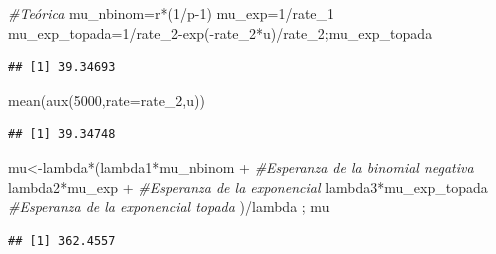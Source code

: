 \documentclass[
]{article}
\newenvironment{Shaded}{\begin{snugshade}}{\end{snugshade}}
\newcommand{\AttributeTok}[1]{\textcolor[rgb]{0.77,0.63,0.00}{#1}}
\newcommand{\CommentTok}[1]{\textcolor[rgb]{0.56,0.35,0.01}{\textit{#1}}}
\newcommand{\DecValTok}[1]{\textcolor[rgb]{0.00,0.00,0.81}{#1}}
\newcommand{\FunctionTok}[1]{\textcolor[rgb]{0.00,0.00,0.00}{#1}}
\newcommand{\NormalTok}[1]{#1}
\newcommand{\OtherTok}[1]{\textcolor[rgb]{0.56,0.35,0.01}{#1}}
\newcommand{\SpecialCharTok}[1]{\textcolor[rgb]{0.00,0.00,0.00}{#1}}
\begin{document}
\begin{Shaded}
\begin{Highlighting}[]
\CommentTok{\#Teórica}
\NormalTok{mu\_nbinom}\OtherTok{=}\NormalTok{r}\SpecialCharTok{*}\NormalTok{(}\DecValTok{1}\SpecialCharTok{/}\NormalTok{p}\DecValTok{{-}1}\NormalTok{)}
\NormalTok{mu\_exp}\OtherTok{=}\DecValTok{1}\SpecialCharTok{/}\NormalTok{rate\_1}
\NormalTok{mu\_exp\_topada}\OtherTok{=}\DecValTok{1}\SpecialCharTok{/}\NormalTok{rate\_2}\SpecialCharTok{{-}}\FunctionTok{exp}\NormalTok{(}\SpecialCharTok{{-}}\NormalTok{rate\_2}\SpecialCharTok{*}\NormalTok{u)}\SpecialCharTok{/}\NormalTok{rate\_2;mu\_exp\_topada}
\end{Highlighting}
\end{Shaded}

\begin{verbatim}
## [1] 39.34693
\end{verbatim}

\begin{Shaded}
\begin{Highlighting}[]
\FunctionTok{mean}\NormalTok{(}\FunctionTok{aux}\NormalTok{(}\DecValTok{5000}\NormalTok{,}\AttributeTok{rate=}\NormalTok{rate\_2,u))}
\end{Highlighting}
\end{Shaded}

\begin{verbatim}
## [1] 39.34748
\end{verbatim}

\begin{Shaded}
\begin{Highlighting}[]
\NormalTok{mu}\OtherTok{\textless{}{-}}\NormalTok{lambda}\SpecialCharTok{*}\NormalTok{(lambda1}\SpecialCharTok{*}\NormalTok{mu\_nbinom }\SpecialCharTok{+}  \CommentTok{\#Esperanza de la binomial negativa}
\NormalTok{        lambda2}\SpecialCharTok{*}\NormalTok{mu\_exp }\SpecialCharTok{+} \CommentTok{\#Esperanza de la exponencial}
\NormalTok{        lambda3}\SpecialCharTok{*}\NormalTok{mu\_exp\_topada }\CommentTok{\#Esperanza de la exponencial topada}
\NormalTok{        )}\SpecialCharTok{/}\NormalTok{lambda ; mu}
\end{Highlighting}
\end{Shaded}

\begin{verbatim}
## [1] 362.4557
\end{verbatim}
\end{document}

